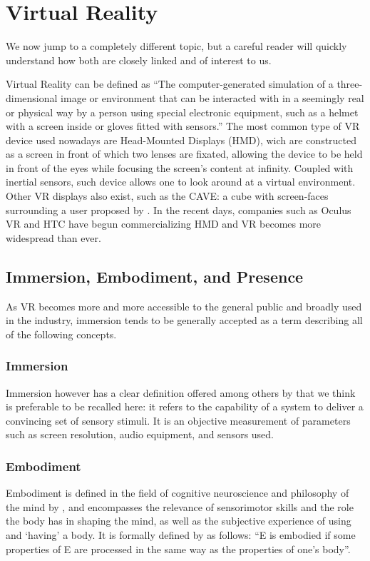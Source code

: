 \section{Virtual Reality}

We now jump to a completely different topic, but a careful reader will quickly understand how both are closely linked and of interest to us.

Virtual Reality can be defined as ``The computer-generated simulation of a three-dimensional image or environment that can be interacted with in a seemingly real or physical way by a person using special electronic equipment, such as a helmet with a screen inside or gloves fitted with sensors.'' \cite{oxford2015} The most common type of VR device used nowadays are Head-Mounted Displays (HMD), wich are constructed as a screen in front of which two lenses are fixated, allowing the device to be held in front of the eyes while focusing the screen's content at infinity. Coupled with inertial sensors, such device allows one to look around at a virtual environment. Other VR displays also exist, such as the CAVE: a cube with screen-faces surrounding a user proposed by \cite{cruz1992cave}. In the recent days, companies such as Oculus VR and HTC have begun commercializing HMD and VR becomes more widespread than ever.

\subsection{Immersion, Embodiment, and Presence}
As VR becomes more and more accessible to the general public and broadly used in the industry, immersion tends to be generally accepted as a term describing all of the following concepts.

\subsubsection{Immersion}
Immersion however has a clear definition offered among others by \cite{slater2003note,sanchez2005presence} that we think is preferable to be recalled here: it refers to the capability of a system to deliver a convincing set of sensory stimuli. It is an objective measurement of parameters such as screen resolution, audio equipment, and sensors used.

\subsubsection{Embodiment}
\label{sec:embodiment}
Embodiment is defined in the field of cognitive neuroscience and philosophy of the mind by \cite{blanke2009full,debarba2017embodiment}, and encompasses the relevance of sensorimotor skills and the role the body has in shaping the mind, as well as the subjective experience of using and `having' a body. It is formally defined by \cite{de2011embodiment} as follows: ``E is embodied if some properties of E are processed in the same way as the properties of one’s body''.

